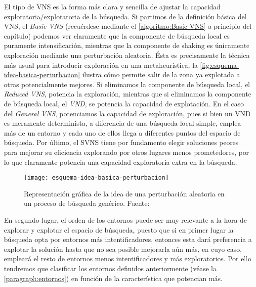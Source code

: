 El tipo de VNS es la forma más clara y sencilla de ajustar la capacidad exploratoria/explotatoria de la búsqueda. Si partimos de la definición básica del VNS, el \textit{Basic VNS} (recuérdese mediante el \autoref{algoritmo:Basic-VNS} a principio del capítulo) podemos ver claramente que la componente de búsqueda local es puramente intensificación, mientras que la componente de shaking es únicamente exploración mediante una perturbación aleatoria. 
Ésta es precisamente la técnica más usual para introducir exploración en una metaheurística, la \autoref{fig:esquema-idea-basica-perturbacion} ilustra cómo permite salir de la zona ya explotada a otras potencialmente mejores. 
Si eliminamos la componente de búsqueda local, el \textit{Reduced VNS}, potencia la exploración, mientras que si eliminamos la componente de búsqueda local, el \textit{VND}, se potencia la capacidad de explotación. 
En el caso del \textit{General VNS}, potenciamos la capacidad de exploración, pues si bien un VND es meramente determinista, a diferencia de una búsqueda local simple, emplea más de un entorno y cada uno de ellos llega a diferentes puntos del espacio de búsqueda. 
Por último, el SVNS tiene por fundamento elegir soluciones peores para mejorar su eficiencia explorando por otros lugares menos prometedores, por lo que claramente potencia una capacidad exploratoria extra en la búsqueda.

\begin{figure}
	\centering	\texttt{[image: esquema-idea-basica-perturbacion]}
	\caption[Representación gráfica de la idea de una perturbación aleatoria en un proceso de búsqueda genérico]{Representación gráfica de la idea de una perturbación aleatoria en un proceso de búsqueda genérico. Fuente:~\cite{sota:metaheuristicas-design-impl}}
	\label{fig:esquema-idea-basica-perturbacion}
\end{figure}

En segundo lugar, el orden de los entornos puede ser muy relevante a la hora de explorar y explotar el espacio de búsqueda, puesto que si en primer lugar la búsqueda opta por entornos más intentificadores, entonces esta dará preferencia a explotar la solución hasta que no sea posible mejorarla aún más, en cuyo caso, empleará el resto de entornos menos intentificadores y más exploratorios. Por ello tendremos que clasificar los entornos definidos anteriormente (véase la \autoref{paragraph:entornos}) en función de la característica que potencian más. 

